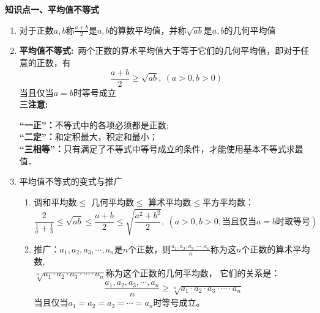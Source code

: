 \documentclass[11pt,a4paper]{article}
\begin{document}
\maketitle



\begin{formal}
    {\large \textbf{知识点一、平均值不等式}}
\end{formal}


\begin{enumerate}
    \item 对于正数$a,b$称$\displaystyle \frac{a+b}{2}\text{是}a,b\text{的算数平均值，并称}\sqrt{ab}\text{是}a,b\text{的几何平均值}$

    \item {\large{\textbf{平均值不等式:}}}\ 两个正数的算术平均值大于等于它们的几何平均值，即对于任意的正数，有
    $$
    \frac{a+b}{2}\ge \sqrt{ab},\ (a>0,b>0)
    $$
    当且仅当$a=b$时等号成立\\
    
    {\large{\textbf{三注意:}}}

    {\large{\textbf{“一正”：}}}不等式中的各项必须都是正数; \\
    {\large{\textbf{“二定”：}}}和定积最大，积定和最小； \\
    {\large{\textbf{“三相等”：}}}只有满足了不等式中等号成立的条件，才能使用基本不等式求最值．\\
    \item 平均值不等式的变式与推广
    \begin{enumerate}
        \item 调和平均数$\le$ 几何平均数$\le$ 算术平均数$\le$平方平均数：
        $$\displaystyle \frac{2}{\frac{1}{a}+\frac{1}{b}} \le \sqrt{ab} \le \frac{a+b}{2}  \le  \sqrt{\frac{a^2+b^2}{2}}, \ (a>0,b>0,\text{当且仅当$a=b$时取等号})$$
    
        \item { 推广：$ a_1,a_2,a_3,\cdots,a_n$是$n$个正数，则$\displaystyle \frac{a_1,a_2,a_3,\cdots,a_n}{n}$称为这$n$个正数的算术平均数,\\ 
        $\sqrt[n]{a_1\cdot a_2\cdot a_3\cdot \cdots \cdot a_n}$称为这个正数的几何平均数，
        它们的关系是：
        $$\displaystyle \frac{a_1,a_2,a_3,\cdots,a_n}{n} \ge \sqrt[n]{a_1\cdot a_2\cdot a_3\cdot \cdots \cdot a_n}$$
        当且仅当$  a_1=a_2=a_3=\cdots=a_n$时等号成立。}
    \end{enumerate}
\end{enumerate}
\end{document}
